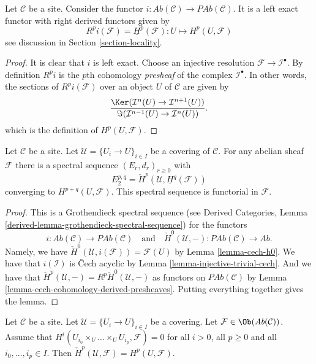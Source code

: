 \begin{lemma}
\label{lemma-include}
Let $\mathcal{C}$ be a site.
Consider the functor
$i : \textit{Ab}(\mathcal{C}) \to \textit{PAb}(\mathcal{C})$.
It is a left exact functor with right derived functors given by
$$
R^pi(\mathcal{F}) = \underline{H}^p(\mathcal{F}) :
U \longmapsto H^p(U, \mathcal{F})
$$
see discussion in Section \ref{section-locality}.
\end{lemma}

\begin{proof}
It is clear that $i$ is left exact.
Choose an injective resolution $\mathcal{F} \to \mathcal{I}^\bullet$.
By definition $R^pi$ is the $p$th cohomology {\it presheaf}
of the complex $\mathcal{I}^\bullet$. In other words, the
sections of $R^pi(\mathcal{F})$ over an object $U$ of $\mathcal{C}$
are given by
$$
\frac{\Ker(\mathcal{I}^n(U) \to \mathcal{I}^{n + 1}(U))}
{\Im(\mathcal{I}^{n - 1}(U) \to \mathcal{I}^n(U))}.
$$
which is the definition of $H^p(U, \mathcal{F})$.
\end{proof}

\begin{lemma}
\label{lemma-cech-spectral-sequence}
Let $\mathcal{C}$ be a site. Let $\mathcal{U} = \{U_i \to U\}_{i \in I}$
be a covering of $\mathcal{C}$. For any abelian sheaf $\mathcal{F}$ there
is a spectral sequence $(E_r, d_r)_{r \geq 0}$ with
$$
E_2^{p, q} = \check{H}^p(\mathcal{U}, \underline{H}^q(\mathcal{F}))
$$
converging to $H^{p + q}(U, \mathcal{F})$.
This spectral sequence is functorial in $\mathcal{F}$.
\end{lemma}

\begin{proof}
This is a Grothendieck spectral sequence (see
Derived Categories, Lemma \ref{derived-lemma-grothendieck-spectral-sequence})
for the functors
$$
i :  \textit{Ab}(\mathcal{C}) \to \textit{PAb}(\mathcal{C})
\quad\text{and}\quad
\check{H}^0(\mathcal{U}, - ) : \textit{PAb}(\mathcal{C})
\to \textit{Ab}.
$$
Namely, we have $\check{H}^0(\mathcal{U}, i(\mathcal{F})) = \mathcal{F}(U)$
by Lemma \ref{lemma-cech-h0}. We have that $i(\mathcal{I})$ is
{\v C}ech acyclic by Lemma \ref{lemma-injective-trivial-cech}. And we
have that $\check{H}^p(\mathcal{U}, -) = R^p\check{H}^0(\mathcal{U}, -)$
as functors on $\textit{PAb}(\mathcal{C})$
by Lemma \ref{lemma-cech-cohomology-derived-presheaves}.
Putting everything together gives the lemma.
\end{proof}

\begin{lemma}
\label{lemma-cech-spectral-sequence-application}
Let $\mathcal{C}$ be a site.
Let $\mathcal{U} = \{U_i \to U\}_{i \in I}$ be a covering.
Let $\mathcal{F} \in \Ob(\textit{Ab}(\mathcal{C}))$.
Assume that $H^i(U_{i_0} \times_U \ldots \times_U U_{i_p}, \mathcal{F}) = 0$
for all $i > 0$, all $p \geq 0$ and all $i_0, \ldots, i_p \in I$.
Then $\check{H}^p(\mathcal{U}, \mathcal{F}) = H^p(U, \mathcal{F})$.
\end{lemma}

